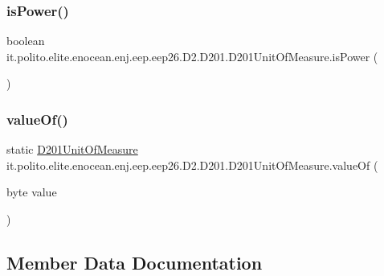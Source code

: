 \subsubsection{\texorpdfstring{is\+Power()}{isPower()}}
{\footnotesize\ttfamily boolean it.\+polito.\+elite.\+enocean.\+enj.\+eep.\+eep26.\+D2.\+D201.\+D201\+Unit\+Of\+Measure.\+is\+Power (\begin{DoxyParamCaption}{ }\end{DoxyParamCaption})}

\hypertarget{enumit_1_1polito_1_1elite_1_1enocean_1_1enj_1_1eep_1_1eep26_1_1_d2_1_1_d201_1_1_d201_unit_of_measure_a42b7e82d33ab09627547b1957c91636f}{}\label{enumit_1_1polito_1_1elite_1_1enocean_1_1enj_1_1eep_1_1eep26_1_1_d2_1_1_d201_1_1_d201_unit_of_measure_a42b7e82d33ab09627547b1957c91636f} 
\subsubsection{\texorpdfstring{value\+Of()}{valueOf()}}
{\footnotesize\ttfamily static \hyperlink{enumit_1_1polito_1_1elite_1_1enocean_1_1enj_1_1eep_1_1eep26_1_1_d2_1_1_d201_1_1_d201_unit_of_measure}{D201\+Unit\+Of\+Measure} it.\+polito.\+elite.\+enocean.\+enj.\+eep.\+eep26.\+D2.\+D201.\+D201\+Unit\+Of\+Measure.\+value\+Of (\begin{DoxyParamCaption}\item[{byte}]{value }\end{DoxyParamCaption})\hspace{0.3cm}{\ttfamily [static]}}



\subsection{Member Data Documentation}
\hypertarget{enumit_1_1polito_1_1elite_1_1enocean_1_1enj_1_1eep_1_1eep26_1_1_d2_1_1_d201_1_1_d201_unit_of_measure_a458959e1ef52b524fa7193c0bb7e773e}{}\label{enumit_1_1polito_1_1elite_1_1enocean_1_1enj_1_1eep_1_1eep26_1_1_d2_1_1_d201_1_1_d201_unit_of_measure_a458959e1ef52b524fa7193c0bb7e773e} 
